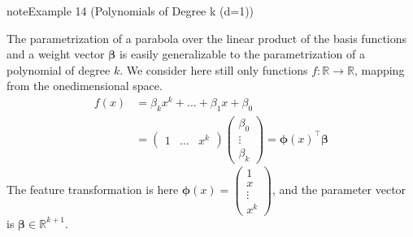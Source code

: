 \documentclass[letterpaper,10pt,english]{jupyterBook}
\begin{document}
\label{regression_functions:example-3}
\begin{sphinxadmonition}{note}{Example 14 (Polynomials of Degree k (d=1))}


\begin{center}\end{center}
\sphinxAtStartPar
The parametrization of a parabola over the linear product of the basis functions and a weight vector \(\bm\beta\) is easily generalizable to the parametrization of a polynomial of degree \(k\). We consider here still only functions \(f:\mathbb{R}\rightarrow\mathbb{R}\), mapping from the one\sphinxhyphen{}dimensional space.
\begin{align*}
    f(x)&=\beta_kx^k+\ldots+\beta_1x+ \beta_0\\
    &= \begin{pmatrix}
    1&\ldots & x^k\end{pmatrix}
    \begin{pmatrix} \beta_0 \\ \vdots \\ \beta_k
    \end{pmatrix}= \bm{\phi}(x)^\top\bm{\beta}
\end{align*}
\sphinxAtStartPar
The feature transformation is here \(\bm{\phi}(x)=\begin{pmatrix}1\\ x\\\vdots\\x^k\end{pmatrix}\), and the parameter vector is \(\bm\beta\in\mathbb{R}^{k+1}\).
\end{sphinxadmonition}
\label{regression_functions:example-4}
\end{document}
